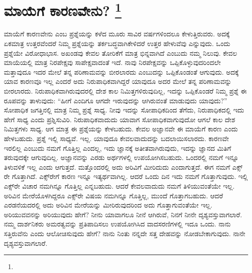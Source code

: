 
\chapter[ಮಾಯೆಗೆ ಕಾರಣವೇನು? ]{ಮಾಯೆಗೆ ಕಾರಣವೇನು? \protect\footnote{}}

ಮಾಯೆಗೆ ಕಾರಣವೇನು ಎಂಬ ಪ್ರಶ್ನೆಯನ್ನು ಕಳೆದ ಮೂರು ಸಾವಿರ ವರ್ಷಗಳಿಂದಲೂ ಕೇಳುತ್ತಿರುವರು. ಅದಕ್ಕೆ ಏಕಮಾತ್ರ ಉತ್ತರವೆಂದರೆ ನಿಮ್ಮ ಪ್ರಶ್ನೆಯನ್ನು ತರ್ಕಬದ್ಧವಾಗಿ\break ಕೇಳಿದರೆ ಉತ್ತರ ಹೇಳುವೆವು ಎನ್ನುವುದು. ಒಂದು ಪ್ರಶ್ನೆಯೇ ವಿರೋಧಾಭಾಸ. ಅಖಂಡವು ಕೇವಲ ತೋರಿಕೆಗೆ ಮಾತ್ರ ಭಿನ್ನವಾಗಿದೆ ಎಂಬುದು ನಮ್ಮ ನಿಲುವು. ಕೇವಲ ಮಾಯೆಯಲ್ಲಿ ಮಾತ್ರ ನಿರಪೇಕ್ಷವು ಸಾಪೇಕ್ಷವಾದಂತೆ ಇದೆ. ನಾವು ನಿರಪೇಕ್ಷವನ್ನು ಒಪ್ಪಿಕೊಳ್ಳುವುದರಿಂದಲೇ ಮತ್ತಾವುದೂ ಇದರ ಮೇಲೆ ತನ್ನ ಪರಿಣಾಮವನ್ನು ಬೀರಲಾರದು ಎಂಬುದನ್ನು ಒಪ್ಪಿಕೊಂಡಂತೆ ಆಗುವುದು. ಅದಕ್ಕೆ ಯಾವ ಕಾರಣವೂ ಇಲ್ಲ ಎಂದರೆ ಅದು ನಿರುಪಾಧಿಕವಾಗಿದ್ದರೆ ಯಾವುದೂ ಅದರ ಮೇಲೆ ತನ್ನ ಪರಿಣಾಮವನ್ನು ಬೀರಲಾರದು. ನಿರುಪಾಧಿಕವಾಗಿರುವುದರಲ್ಲಿ ದೇಶ ಕಾಲ ನಿಮಿತ್ತಗಳಿರುವುದಿಲ್ಲ, ಇದನ್ನು ಒಪ್ಪಿಕೊಂಡರೆ ನಿಮ್ಮ ಪ್ರಶ್ನೆ ಈ ರೂಪವನ್ನು ತಾಳುವುದು: “ಹೀಗೆ ಎಂದಿಗೂ ಆಗದೇ ಇರುವುದನ್ನು ಆಗಿರುವಂತೆ ಮಾಡುವುದು ಯಾವುದು?” ಸೋಪಾಧಿಕ ಜಗತ್ತಿನಲ್ಲಿ ಮಾತ್ರ ನಿಮ್ಮ ಪ್ರಶ್ನೆ ಸಾಧ್ಯ. ನೀವು ಇದನ್ನು ಸೋಪಾಧಿಕದಿಂದ ತೆಗೆದು, ನಿರುಪಾಧಿಕದಲ್ಲಿ ಇದು ಹೇಗೆ ಸಾಧ್ಯ ಎಂದು ಪ್ರಶ್ನಿಸುವಿರಿ. ನಿರುಪಾಧಿಕವಾದುದು ಯಾವಾಗ ಸೋಪಾಧಿಕವಾಗುವುದೋ ಆಗಲೆ ಕಾಲ ದೇಶ ನಿಮಿತ್ತಗಳು ಸಾಧ್ಯ. ಆಗ ಮಾತ್ರ ಈ ಪ್ರಶ್ನೆಯನ್ನು ಕೇಳಬಹುದು. ಕೇವಲ ಅಜ್ಞಾನವೇ ಈ ಮಾಯೆಗೆ ಕಾರಣ ಎಂದು ಹೇಳಬಹುದು. ಪ್ರಶ್ನೆ ಇಲ್ಲಿ ಸಾಧ್ಯವೆ. ಇಲ್ಲ. ಯಾವುದೂ ಕೇವಲವಾದುದನ್ನು ಬದಲಾಯಿಸಲಾರದು. ಕಾರಣವೇ ಇರಲಿಲ್ಲ ಎಂಬುದು ನಮಗೆ ಗೊತ್ತಿಲ್ಲ ಎಂದಲ್ಲ, ಇದು ಜ್ಞಾನಕ್ಕೆ ಅತೀತವಾಗಿರುವುದು, ಇದನ್ನು ಜ್ಞಾನದ ಮಿತಿಗೆ ತರುವುದಕ್ಕೇ ಆಗುವುದಿಲ್ಲ. ಅಜ್ಞಾನವನ್ನು ಎರಡು ಅರ್ಥಗಳಲ್ಲಿ ಉಪಯೋಗಿಸಬಹುದು. ಒಂದರಲ್ಲಿ ನಮಗೆ ಇನ್ನೂ ತಿಳುವಳಿಕೆ ಇಲ್ಲ ಎಂದು ಆಗುತ್ತದೆ. ಮತ್ತೊಂದರಲ್ಲಿ ಅದು ಅರಿವಿಗೆ ಮೀರಿದುದು ಎಂದಾಗುತ್ತದೆ. ಈಗ ನಮಗೆ ಎಕ್ಸ್​ರೇ ಗೊತ್ತಾಗಿದೆ. ಎಕ್ಸ್​ರೇಗೆ ಕಾರಣ ಇನ್ನೂ ಇತ್ಯರ್ಥವಾಗಿಲ್ಲ. ಆದರೆ ಒಂದು ದಿನ ಇದು ನಮಗೆ ಗೊತ್ತಾಗುವುದು. ಇಲ್ಲಿ ಎಕ್ಸ್​ರೇ ವಿಚಾರ ನಮಗಿನ್ನೂ ಗೊತ್ತಿಲ್ಲ ಎನ್ನಬಹುದು. ಆದರೆ ಕೇವಲವಾದುದು ನಮಗೆ ತಿಳಿಯುವಂತೆಯೇ ಇಲ್ಲ. ಅರಿವಿನ ಮೇರೆಯೊಳಗಿದ್ದರೂ ಎಕ್ಸ್​ರೇ ವಿಷಯ ನಮಗಿನ್ನೂ ಗೊತ್ತಿಲ್ಲ, ಮುಂದೆ ಗೊತ್ತಾಗಬಹುದು. ಆದರೆ ಎರಡನೆಯದರಲ್ಲಿ ಅದು ಅರಿವಿನ ಮೇರೆಯನ್ನು ಮೀರಿರುವುದರಿಂದ ಅದು ಗೊತ್ತಾಗುವಂತೆಯೇ ಇಲ್ಲ. ಅರಿಯುವವನನ್ನು ಅರಿಯುವುದು ಹೇಗೆ? ನೀನು ಯಾವಾಗಲೂ ನೀನೆ ಆಗಿರುವೆ, ನಿನಗೆ ನೀನೇ ದೃಶ್ಯವಸ್ತುವಾಗಲಾರೆ. ನಮ್ಮ ದಾರ್ಶನಿಕರು ಅಮರತ್ವವನ್ನು ಪ್ರತಿಪಾದಿಸಲು ಉಪಯೋಗಿಸಿದ ವಾದಸರಣಿಗಳಲ್ಲಿ ಇದೂ ಒಂದು. ನಾನು ಸತ್ತಿರುವೆನು ಎಂದು ಆಲೋಚಿಸುವುದು ಹೇಗೆ? ನಾನು ನಿಂತು ನನ್ನದೇ ಸತ್ತ ದೇಹವನ್ನು ನೋಡಬೇಕಾಗುವುದು. ನಾನೇ ದೃಶ್ಯವಸ್ತುವಾಗಲಾರೆ.


